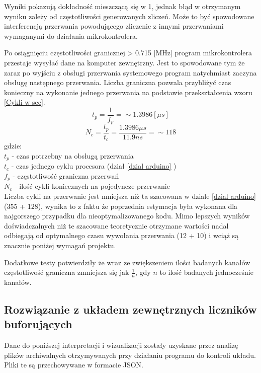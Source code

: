 Wyniki pokazują dokładność mieszczącą się w  1\textperthousand, 
jednak błąd w otrzymanym wyniku zależy od częstotliwości generowanych zliczeń.
Może to być spowodowane interferencją przerwania powodującego zliczenie z innymi przerwaniami wymaganymi do działania mikrokontrolera.

Po osiągnięciu częstotliwości granicznej > 0.715 [MHz] program mikrokontrolera przestaje wysyłać dane na komputer zewnętrzny.
Jest to spowodowane tym że zaraz po wyjściu z obsługi przerwania systemowego program natychmiast zaczyna obsługę następnego przerwania. 
Liczba graniczna pozwala przybliżyć czas konieczny na wykonanie jednego przerwania na podstawie przekształcenia wzoru \ref{Cykli w sec}. 
$$ t_p = \frac{1}{f_p} = \sim 1.3986 [\mu s] $$
$$ N_c = \frac{t_p}{t_c} =  \frac{1.3986 \mu s}{11.9 ns} =\sim 118$$
gdzie: \\
        \indent $t_p$ -  czas potrzebny na obsługą przerwania\\
        \indent $t_c$ -  czas jednego cyklu procesora (dział \ref{dzial arduino} ) \\
        \indent $f_p$ -  częstotliwość graniczna przerwań \\
        \indent $N_c$ -  ilość cykli koniecznych na pojedyncze przerwanie \\

Liczba cykli na przerwanie jest mniejsza niż ta szacowana w dziale \ref{dzial arduino} (355 + 128)\cite{ard_opt_git}, wynika to z faktu że poprzednia estymacja była wykonana dla najgorszego przypadku dla nieoptymalizowanego kodu.
Mimo lepszych wyników doświadczalnych niż te szacowane teoretycznie otrzymane wartości nadal odbiegają od optymalnego czasu wywołania przerwania (12 + 10) \cite{interupt latency} i wciąż są znacznie poniżej wymagań projektu. 

Dodatkowe testy potwierdziły że wraz ze zwiększeniem ilości badanych kanałów częstotliwość graniczna zmniejsza się jak $\frac{1}{n}$, gdy $n$ to ilość badanych jednocześnie kanałów. 

\subsection{Rozwiązanie z układem zewnętrznych liczników buforujących}

Dane do poniższej interpretacji i wizualizacji zostały uzyskane przez analizę plików archiwalnych otrzymywanych przy działaniu programu do kontroli układu.
Pliki te są przechowywane w formacie JSON.


